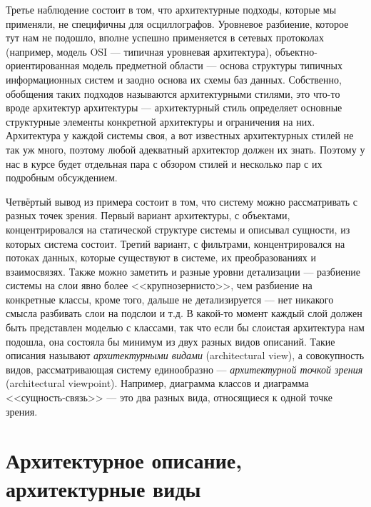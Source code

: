 \documentclass{../../text-style}
\begin{document}
Третье наблюдение состоит в том, что архитектурные подходы, которые мы применяли, не специфичны для осциллографов. Уровневое разбиение, которое тут нам не подошло, вполне успешно применяется в сетевых протоколах (например, модель OSI --- типичная уровневая архитектура), объектно-ориентированная модель предметной области --- основа структуры типичных информационных систем и заодно основа их схемы баз данных. Собственно, обобщения таких подходов называются архитектурными стилями, это что-то вроде архитектур архитектуры --- архитектурный стиль определяет основные структурные элементы конкретной архитектуры и ограничения на них. Архитектура у каждой системы своя, а вот известных архитектурных стилей не так уж много, поэтому любой адекватный архитектор должен их знать. Поэтому у нас в курсе будет отдельная пара с обзором стилей и несколько пар с их подробным обсуждением.

Четвёртый вывод из примера состоит в том, что систему можно рассматривать с разных точек зрения. Первый вариант архитектуры, с объектами, концентрировался на статической структуре системы и описывал сущности, из которых система состоит. Третий вариант, с фильтрами, концентрировался на потоках данных, которые существуют в системе, их преобразованиях и взаимосвязях. Также можно заметить и разные уровни детализации --- разбиение системы на слои явно более <<крупнозернисто>>, чем разбиение на конкретные классы, кроме того, дальше не детализируется --- нет никакого смысла разбивать слои на подслои и т.д. В какой-то момент каждый слой должен быть представлен моделью с классами, так что если бы слоистая архитектура нам подошла, она состояла бы минимум из двух разных видов описаний. Такие описания называют \emph{архитектурными видами} (architectural view), а совокупность видов, рассматривающая систему единообразно --- \emph{архитектурной точкой зрения} (architectural viewpoint). Например, диаграмма классов и диаграмма <<сущность-связь>> --- это два разных вида, относящиеся к одной точке зрения.

\section{Архитектурное описание, архитектурные виды}
\end{document}
